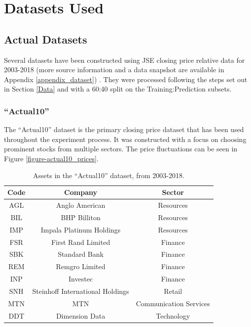 \documentclass[a4paper,11pt,oneside]{article}
\theoremstyle{plain}
\theoremstyle{definition}
\begin{document}
	\newpage
	\section{Datasets Used}\label{Datasets}
	
	\subsection{Actual Datasets}
	
	Several datasets have been constructed using JSE closing price relative data for 2003-2018 (more source information and a data snapshot are available in Appendix \ref{appendix_dataset}) \citep{JSEData}. They were processed following the steps set out in Section \ref{Data} and with a 60:40 split on the Training:Prediction subsets.
	
	\subsubsection{``Actual10''}\label{dataset_actual10}
	
	The ``Actual10'' dataset is the primary closing price dataset that has been used throughout the experiment process. It was constructed with a focus on choosing prominent stocks from multiple sectors. The price fluctuations can be seen in Figure \ref{figure-actual10_prices}.
	
	\begin{table}[H]
		\centering
		\begin{tabular}{|c|c|c|}
			\hline
			\rowcolor{beaublue}
			\textbf{Code} &\textbf{Company} & \textbf{Sector} \\\hline	
			{AGL} & {Anglo American} & {Resources}  \\\hline
			{BIL} & {BHP Billiton} & {Resources}  \\\hline
			{IMP} & {Impala Platinum Holdings} & {Resources}  \\\hline
			{FSR} & {First Rand Limited} & {Finance}  \\\hline
			{SBK} & {Standard Bank} & {Finance}  \\\hline
			{REM} & {Remgro Limited} & {Finance}  \\\hline
			{INP} & {Investec} & {Finance}  \\\hline
			{SNH} & {Steinhoff International Holdings} & {Retail}    \\\hline
			{MTN} & {MTN} & {Communication Services}  \\\hline
			{DDT} & {Dimension Data} & {Technology} \\\hline
		\end{tabular}
		\newline\newline
		\caption{Assets in the ``Actual10'' dataset, from 2003-2018. }\label{tab_actual10}
	\end{table}
	
\end{document}

